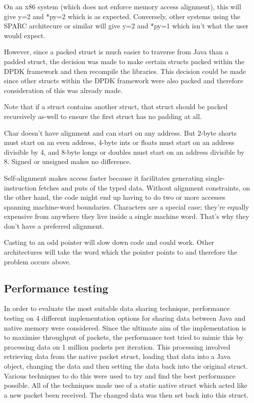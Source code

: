 \documentclass[final_report.tex]{subfiles}
\begin{document}
On an x86 system (which does not enforce memory access alignment), this will give y=2 and *py=2 which is as expected. Conversely, other systems using the SPARC architecure or similar will give y=2 and *py=1 which isn't what the user would expect.

However, since a packed struct is much easier to traverse from Java than a padded struct, the decision was made to make certain structs packed within the DPDK framework and then recompile the libraries. This decision could be made since other structs within the DPDK framework were also packed and therefore consideration of this was already made.

Note that if a struct contains another struct, that struct should be packed recursively as-well to ensure the first struct has no padding at all.

Char doesn't have alignment and can start on any address. But 2-byte shorts must start on an even address, 4-byte ints or floats must start on an address divisible by 4, and 8-byte longs or doubles must start on an address divisible by 8. Signed or unsigned makes no difference.

Self-alignment makes access faster because it facilitates generating single-instruction fetches and puts of the typed data. Without alignment constraints, on the other hand, the code might end up having to do two or more accesses spanning machine-word boundaries. Characters are a special case; they're equally expensive from anywhere they live inside a single machine word. That's why they don't have a preferred alignment.

Casting to an odd pointer will slow down code and could work. Other architectures will take the word which the pointer points to and therefore the problem occurs above.

\subsection{Performance testing}
In order to evaluate the most suitable data sharing technique, performance testing on 4 different implementation options for sharing data between Java and native memory were considered. Since the ultimate aim of the implementation is to maximise throughput of packets, the performance test tried to mimic this by processing data on 1 million packets per iteration. This processing involved retrieving data from the native packet struct, loading that data into a Java object, changing the data and then setting the data back into the original struct. Various techniques to do this were used to try and find the best performance possible. All of the techniques made use of a static native struct which acted like a new packet been received. The changed data was then set back into this struct.
\end{document}
